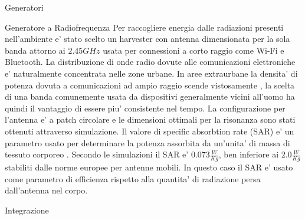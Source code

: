 \begin{multicols}{2}
\begin{section}{Generatori}
    \begin{subsection}{Generatore a Radiofrequenza}
        Per raccogliere energia dalle radiazioni presenti nell'ambiente e' stato scelto un harvester con antenna dimensionata per la sola banda attorno ai \(2.45GHz\) usata per connessioni a corto raggio come Wi-Fi e Bluetooth. La distribuzione di onde radio dovute alle comunicazioni elettroniche e' naturalmente concentrata nelle zone urbane. In aree extraurbane la densita' di potenza dovuta a comunicazioni ad ampio raggio scende vistosamente \cite{ibrahimRadioFrequencyEnergy2022}, la scelta di una banda comunemente usata da dispositivi generalmente vicini all'uomo ha quindi il vantaggio di essere piu' consistente nel tempo. La configurazione per l'antenna e' a patch circolare e le dimensioni ottimali per la risonanza sono stati ottenuti attraverso simulazione. Il valore di specific absorbtion rate (SAR) e' un parametro usato per determinare la potenza assorbita da un'unita' di massa di tessuto corporeo \cite{vallozzi26LatestDevelopments2016}. Secondo le simulazioni il SAR e' \(0.073\frac{W}{Kg}\), ben inferiore ai \(2.0\frac{W}{Kg}\) stabiliti dalle norme europee per antenne mobili. In questo caso il SAR e' usato come parametro di efficienza rispetto alla quantita' di radiazione persa dall'antenna nel corpo.
    \end{subsection}

    \begin{subsection}{Integrazione}
        
    \end{subsection}

\end{section}

\end{multicols}